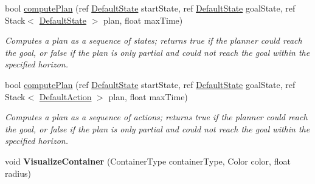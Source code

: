 \begin{DoxyCompactItemize}
\item 
\hypertarget{class_best_first_search_planner_a777fb06939a33b3f3effb24b0dbda076}{bool \hyperlink{class_best_first_search_planner_a777fb06939a33b3f3effb24b0dbda076}{compute\-Plan} (ref \hyperlink{class_default_state}{Default\-State} start\-State, ref \hyperlink{class_default_state}{Default\-State} goal\-State, ref Stack$<$ \hyperlink{class_default_state}{Default\-State} $>$ plan, float max\-Time)}\label{class_best_first_search_planner_a777fb06939a33b3f3effb24b0dbda076}

\begin{DoxyCompactList}\small\item\em Computes a plan as a sequence of states; returns true if the planner could reach the goal, or false if the plan is only partial and could not reach the goal within the specified horizon. \end{DoxyCompactList}\item 
\hypertarget{class_best_first_search_planner_a0367a0321408a4d7c9796739650b2bee}{bool \hyperlink{class_best_first_search_planner_a0367a0321408a4d7c9796739650b2bee}{compute\-Plan} (ref \hyperlink{class_default_state}{Default\-State} start\-State, ref \hyperlink{class_default_state}{Default\-State} goal\-State, ref Stack$<$ \hyperlink{class_default_action}{Default\-Action} $>$ plan, float max\-Time)}\label{class_best_first_search_planner_a0367a0321408a4d7c9796739650b2bee}

\begin{DoxyCompactList}\small\item\em Computes a plan as a sequence of actions; returns true if the planner could reach the goal, or false if the plan is only partial and could not reach the goal within the specified horizon. \end{DoxyCompactList}\item 
\hypertarget{class_best_first_search_planner_af0e16fec4b04283bf4da46b5dcd6efe3}{void {\bfseries Visualize\-Container} (Container\-Type container\-Type, Color color, float radius)}\label{class_best_first_search_planner_af0e16fec4b04283bf4da46b5dcd6efe3}

\end{DoxyCompactItemize}
